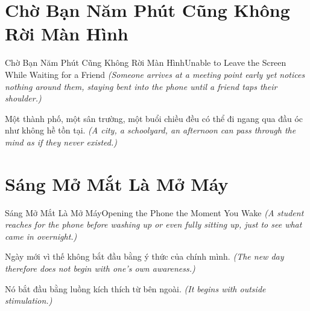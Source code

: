 \section{Chờ Bạn Năm Phút Cũng Không Rời Màn Hình}
\begin{truyen}{Chờ Bạn Năm Phút Cũng Không Rời Màn Hình}{Unable to Leave the Screen While Waiting for a Friend}
\textit{(Someone arrives at a meeting point early yet notices nothing around them, staying bent into the phone until a friend taps their shoulder.)}

Một thành phố, một sân trường, một buổi chiều đều có thể đi ngang qua đầu óc như không hề tồn tại.
\textit{(A city, a schoolyard, an afternoon can pass through the mind as if they never existed.)}

\end{truyen}

\section{Sáng Mở Mắt Là Mở Máy}
\begin{truyen}{Sáng Mở Mắt Là Mở Máy}{Opening the Phone the Moment You Wake}
\textit{(A student reaches for the phone before washing up or even fully sitting up, just to see what came in overnight.)}

Ngày mới vì thế không bắt đầu bằng ý thức của chính mình.
\textit{(The new day therefore does not begin with one's own awareness.)}

Nó bắt đầu bằng luồng kích thích từ bên ngoài.
\textit{(It begins with outside stimulation.)}

\end{truyen}

